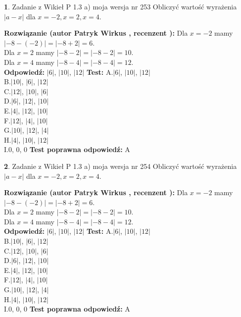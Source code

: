 \documentclass[12pt, a4paper]{article}
\theoremstyle{definition} %
\newtheorem{zad}{}
\newcommand{\zadStart}[1]{\begin{zad}#1\newline}
\newcommand{\zadStop}{\end{zad}}
\newcommand{\rozwStart}[2]{\noindent \textbf{Rozwiązanie (autor #1 , recenzent #2): }\newline}
\newcommand{\rozwStop}{\newline}
\newcommand{\odpStart}{\noindent \textbf{Odpowiedź:}\newline}
\newcommand{\odpStop}{\newline}
\newcommand{\testStart}{\noindent \textbf{Test:}\newline}
\newcommand{\testStop}{\newline}
\newcommand{\kluczStart}{\noindent \textbf{Test poprawna odpowiedź:}\newline}
\newcommand{\kluczStop}{\newline}
\begin{document}
\zadStart{Zadanie z Wikieł P 1.3 a) moja wersja nr 253}
Obliczyć wartość wyrażenia $|a - x|$ dla $x=-2,x=2,x=4$.
\zadStop
\rozwStart{Patryk Wirkus}{}
Dla $x = -2$ mamy $|-8 - (-2)| = |-8 + 2| = 6$.\\
Dla $x = 2$ mamy $|-8 - 2| = |-8 - 2| = 10$.\\
Dla $x = 4$ mamy $|-8 - 4| = |-8 - 4| = 12$.\\
\rozwStop
\odpStart
$|6|$, $|10|$, $|12|$
\odpStop
\testStart
A.$|6|$, $|10|$, $|12|$\\
B.$|10|$, $|6|$, $|12|$\\
C.$|12|$, $|10|$, $|6|$\\
D.$|6|$, $|12|$, $|10|$\\
E.$|4|$, $|12|$, $|10|$\\
F.$|12|$, $|4|$, $|10|$\\
G.$|10|$, $|12|$, $|4|$\\
H.$|4|$, $|10|$, $|12|$\\
I.$0$, $0$, $0$
\testStop
\kluczStart
A
\kluczStop



\zadStart{Zadanie z Wikieł P 1.3 a) moja wersja nr 254}
Obliczyć wartość wyrażenia $|a - x|$ dla $x=-2,x=2,x=4$.
\zadStop
\rozwStart{Patryk Wirkus}{}
Dla $x = -2$ mamy $|-8 - (-2)| = |-8 + 2| = 6$.\\
Dla $x = 2$ mamy $|-8 - 2| = |-8 - 2| = 10$.\\
Dla $x = 4$ mamy $|-8 - 4| = |-8 - 4| = 12$.\\
\rozwStop
\odpStart
$|6|$, $|10|$, $|12|$
\odpStop
\testStart
A.$|6|$, $|10|$, $|12|$\\
B.$|10|$, $|6|$, $|12|$\\
C.$|12|$, $|10|$, $|6|$\\
D.$|6|$, $|12|$, $|10|$\\
E.$|4|$, $|12|$, $|10|$\\
F.$|12|$, $|4|$, $|10|$\\
G.$|10|$, $|12|$, $|4|$\\
H.$|4|$, $|10|$, $|12|$\\
I.$0$, $0$, $0$
\testStop
\kluczStart
A
\kluczStop
\end{document}
